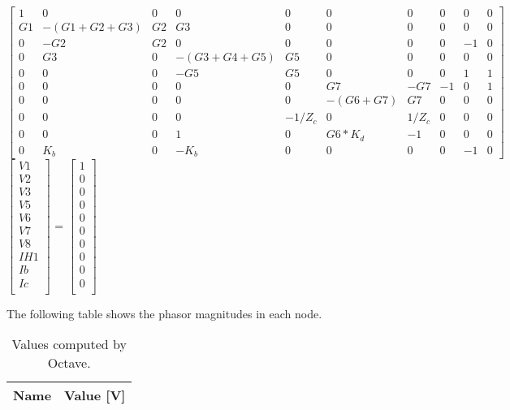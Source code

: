 {\footnotesize
$ \begin{bmatrix}
1 & 0 & 0 & 0 & 0 & 0 & 0 & 0 & 0 & 0 \\
G1 & -(G1+G2+G3) & G2 & G3 & 0 & 0 & 0 & 0 & 0 & 0 \\
0 & -G2 & G2 & 0 & 0 & 0 & 0 & 0 & -1 & 0 \\
0 & G3 & 0 & -(G3+G4+G5) & G5 & 0 & 0 & 0 & 0 & 0 \\
0 & 0 & 0 & -G5 & G5 & 0 & 0 & 0 & 1 & 1 \\
0 & 0 & 0 & 0 & 0 & G7 & -G7 & -1 & 0 & 1 \\
0 & 0 & 0 & 0 & 0 & -(G6+G7) & G7 & 0 & 0 & 0 \\
0 & 0 & 0 & 0 & -1/Z_c & 0 & 1/Z_c & 0 & 0 & 0 \\
0 & 0 & 0 & 1 & 0 & G6*K_d & -1 & 0 & 0 & 0 \\
0 & K_b & 0 & -K_b & 0 & 0 & 0 & 0 & -1 & 0 
\end{bmatrix}  $
$ \begin{bmatrix}
V1 \\
V2 \\
V3 \\
V5 \\
V6 \\
V7 \\
V8 \\
IH1 \\
Ib\\
Ic\\
\end{bmatrix}  $
=
$ \begin{bmatrix}
1 \\
0 \\
0 \\
0 \\
0 \\
0 \\
0 \\
0 \\
0 \\
0 \\
\end{bmatrix}  $

}

The following table shows the phasor magnitudes in each node.

\begin{table}[ht]
	\centering
	\begin{tabular}{|l|r|}
    		\hline    
    		{\bf Name} & {\bf Value [V]} \\ \hline
    		
  	\end{tabular}
  	\caption{Values computed by Octave.}
 
\label{tab:node}
\end{table}


